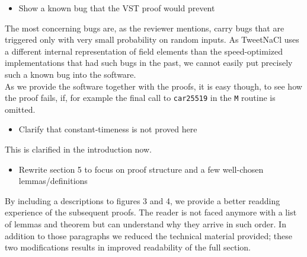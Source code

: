 \begin{center}
\end{center}

\begin{itemize}
  \item Show a known bug that the VST proof would prevent
\end{itemize}
\begin{answer}
  The most concerning bugs are, as the reviewer mentions, carry bugs that are triggered only with
  very small probability on random inputs. As TweetNaCl uses a different internal representation
  of field elements than the speed-optimized implementations that had such bugs in the past, we
  cannot easily put precisely such a known bug into the software.\\
  As we provide the software together with the proofs, it is easy though, to see how the proof fails,
  if, for example the final call to \texttt{car25519} in the \texttt{M} routine is omitted.
\end{answer}
\begin{itemize}
  \item Clarify that constant-timeness is not proved here
\end{itemize}
\begin{answer}
  This is clarified in the introduction now.
\end{answer}
\begin{itemize}
  \item Rewrite section 5 to focus on proof structure and a few well-chosen lemmas/definitions
\end{itemize}
\begin{answer}
  By including a descriptions to figures 3 and 4, we provide a better readding experience of the subsequent proofs.
  The reader is not faced anymore with a list of lemmas and theorem but can understand why they arrive in such order.
  In addition to those paragraphs we reduced the technical material provided; these two modifications results in
  improved readability of the full section.
\end{answer}


